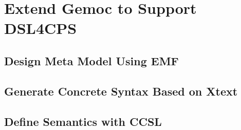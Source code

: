\section{Extend Gemoc to Support DSL4CPS}
\subsection{Design Meta Model Using EMF}
\subsection{Generate Concrete Syntax Based on Xtext}
\subsection{Define Semantics with CCSL}
